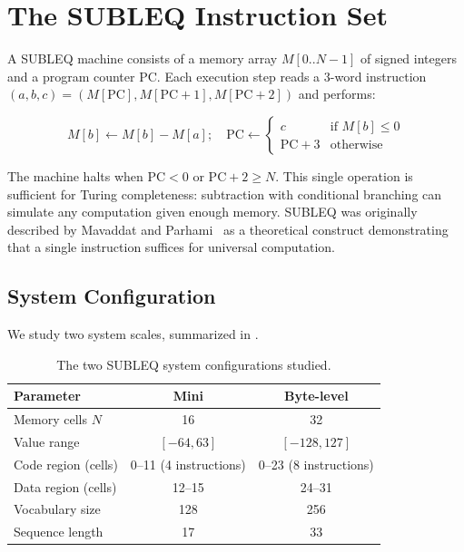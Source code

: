 \documentclass[11pt,a4paper]{article}
\begin{document}
\section{The SUBLEQ Instruction Set}
\label{sec:subleq}

A SUBLEQ machine consists of a memory array $M[0..N{-}1]$ of signed integers and a program counter $\mathrm{PC}$.
Each execution step reads a 3-word instruction $(a, b, c) = (M[\mathrm{PC}], M[\mathrm{PC}+1], M[\mathrm{PC}+2])$ and performs:

\begin{equation}
  M[b] \leftarrow M[b] - M[a]; \quad
  \mathrm{PC} \leftarrow
  \begin{cases}
    c & \text{if } M[b] \leq 0 \\
    \mathrm{PC} + 3 & \text{otherwise}
  \end{cases}
  \label{eq:subleq}
\end{equation}

The machine halts when $\mathrm{PC} < 0$ or $\mathrm{PC} + 2 \geq N$.
This single operation is sufficient for Turing completeness: subtraction with conditional branching can simulate any computation given enough memory.
SUBLEQ was originally described by Mavaddat and Parhami~\cite{mavaddat1988} as a theoretical construct demonstrating that a single instruction suffices for universal computation.

\subsection{System Configuration}

We study two system scales, summarized in .

\begin{table}[h]
\centering
\caption{The two SUBLEQ system configurations studied.}
\label{tab:systems}
\begin{tabular}{lcc}
\toprule
\textbf{Parameter} & \textbf{Mini} & \textbf{Byte-level} \\
\midrule
Memory cells $N$ & 16 & 32 \\
Value range & $[-64, 63]$ & $[-128, 127]$ \\
Code region (cells) & 0--11 (4 instructions) & 0--23 (8 instructions) \\
Data region (cells) & 12--15 & 24--31 \\
Vocabulary size & 128 & 256 \\
Sequence length & 17 & 33 \\
\bottomrule
\end{tabular}
\end{table}
\end{document}
